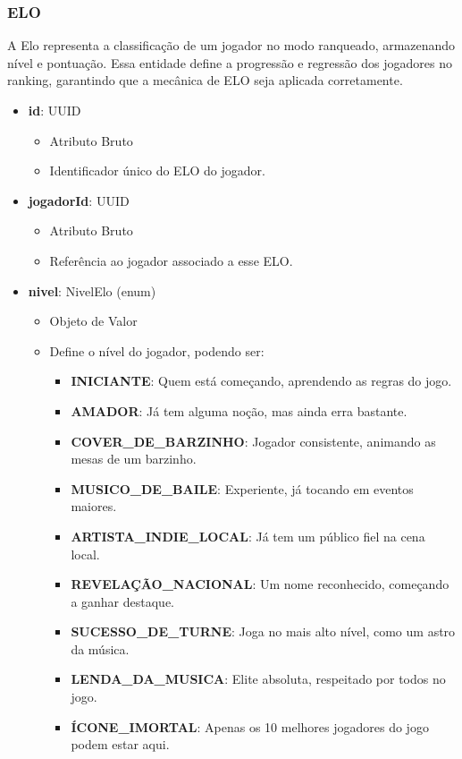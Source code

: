     \subsubsection{ELO}
    A Elo representa a classificação de um jogador no modo ranqueado, armazenando nível e pontuação. Essa entidade define a progressão e regressão dos jogadores no ranking, garantindo que a mecânica de ELO seja aplicada corretamente.
    \begin{itemize}
        \item \textbf{id}: UUID  
              \begin{itemize}
                  \item Atributo Bruto
                  \item Identificador único do ELO do jogador.
              \end{itemize}
    
        \item \textbf{jogadorId}: UUID  
              \begin{itemize}
                  \item Atributo Bruto
                  \item Referência ao jogador associado a esse ELO.
              \end{itemize}
    
        \item \textbf{nivel}: NivelElo (enum)  
              \begin{itemize}
                  \item Objeto de Valor
                  \item Define o nível do jogador, podendo ser:
                  \begin{itemize}
                      \item \textbf{INICIANTE}: Quem está começando, aprendendo as regras do jogo.
                      \item \textbf{AMADOR}: Já tem alguma noção, mas ainda erra bastante.
                      \item \textbf{COVER\_DE\_BARZINHO}: Jogador consistente, animando as mesas de um barzinho.
                      \item \textbf{MUSICO\_DE\_BAILE}: Experiente, já tocando em eventos maiores.
                      \item \textbf{ARTISTA\_INDIE\_LOCAL}: Já tem um público fiel na cena local.
                      \item \textbf{REVELAÇÃO\_NACIONAL}: Um nome reconhecido, começando a ganhar destaque.
                      \item \textbf{SUCESSO\_DE\_TURNE}: Joga no mais alto nível, como um astro da música.
                      \item \textbf{LENDA\_DA\_MUSICA}: Elite absoluta, respeitado por todos no jogo.
                      \item \textbf{ÍCONE\_IMORTAL}: Apenas os 10 melhores jogadores do jogo podem estar aqui.
                  \end{itemize}
              \end{itemize}
    

\end{itemize}
